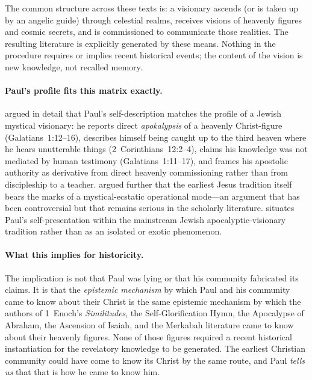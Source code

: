 \documentclass[12pt,oneside]{article}
\begin{document}
The common structure across these texts is: a visionary ascends (or
is taken up by an angelic guide) through celestial realms, receives
visions of heavenly figures and cosmic secrets, and is commissioned
to communicate those realities.  The resulting literature is
explicitly generated by these means.  Nothing in the procedure
requires or implies recent historical events; the content of the
vision is new knowledge, not recalled memory.

\paragraph{Paul's profile fits this matrix exactly.}
\citet{Segal1990} argued in detail that Paul's self-description
matches the profile of a Jewish mystical visionary: he reports
direct \textit{apokalypsis} of a heavenly Christ-figure
(Galatians~1:12--16), describes himself being caught up to the third
heaven where he hears unutterable things (2~Corinthians~12:2--4),
claims his knowledge was not mediated by human testimony
(Galatians~1:11--17), and frames his apostolic authority as derivative
from direct heavenly commissioning rather than from discipleship to
a teacher.  \citet{MortonSmith1978} argued further that the earliest
Jesus tradition itself bears the marks of a mystical-ecstatic
operational mode---an argument that has been controversial but that
remains serious in the scholarly literature.  \citet{Rowland1982}
situates Paul's self-presentation within the mainstream Jewish
apocalyptic-visionary tradition rather than as an isolated or exotic
phenomenon.

\paragraph{What this implies for historicity.}
The implication is not that Paul was lying or that his community
fabricated its claims.  It is that the \textit{epistemic mechanism}
by which Paul and his community came to know about their Christ is
the same epistemic mechanism by which the authors of 1~Enoch's
\textit{Similitudes}, the Self-Glorification Hymn, the Apocalypse of
Abraham, the Ascension of Isaiah, and the Merkabah literature came
to know about their heavenly figures.  None of those figures
required a recent historical instantiation for the revelatory
knowledge to be generated.  The earliest Christian community could
have come to know its Christ by the same route, and Paul
\textit{tells us} that that is how he came to know him.
\end{document}
